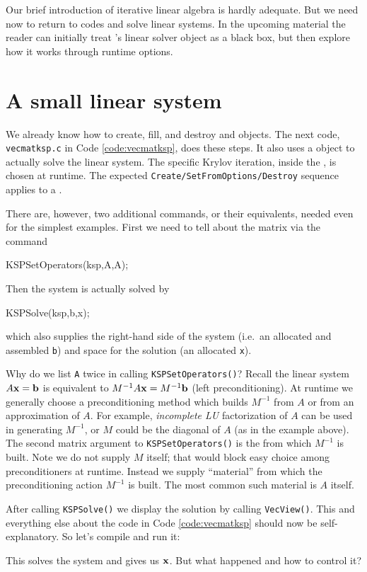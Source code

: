 Our brief introduction of iterative linear algebra is hardly adequate.  But we need now to return to \PETSc codes and solve linear systems.  In the upcoming material the reader can initially treat \PETSc's \pKSP linear solver object as a black box, but then explore how it works through runtime options.


\section{A small linear system}

We already know how to create, fill, and destroy \pVec and \pMat objects.  The next code, \texttt{vecmatksp.c} in Code \ref{code:vecmatksp}, does these steps.  It also uses a \pKSP object to actually solve the linear system.  The specific Krylov iteration, inside the \pKSP, is chosen at runtime.  The expected \texttt{Create/SetFromOptions/Destroy} sequence applies to a \pKSP.

There are, however, two additional commands, or their equivalents, needed even for the simplest examples.  First we need to tell \pKSP about the matrix via the command
\begin{code}
KSPSetOperators(ksp,A,A);
\end{code}
Then the system is actually solved by
\begin{code}
KSPSolve(ksp,b,x);
\end{code}
which also supplies the right-hand side of the system (i.e.~an allocated and assembled \pVec \texttt{b}) and space for the solution (an allocated \pVec \texttt{x}).

Why do we list \texttt{A} twice in calling \texttt{KSPSetOperators()}?  Recall the linear system $A\mathbf{x}=\mathbf{b}$ is equivalent to $M^{-1} A \mathbf{x} = M^{-1} \mathbf{b}$ (left preconditioning).  At runtime we generally choose a preconditioning method which builds $M^{-1}$ from $A$ or from an approximation of $A$.  For example, \emph{incomplete LU} factorization of $A$ can be used in generating $M^{-1}$, or $M$ could be the diagonal of $A$ (as in the example above).  The second matrix argument to \texttt{KSPSetOperators()} is the \pMat from which $M^{-1}$ is built.  Note we do not supply $M$ itself; that would block easy choice among preconditioners at runtime.  Instead we supply ``material'' from which the preconditioning action $M^{-1}$ is built.  The most common such material is $A$ itself.

After calling \texttt{KSPSolve()} we display the solution \pVec by calling \texttt{VecView()}.  This and everything else about the code in Code \ref{code:vecmatksp} should now be self-explanatory.  So let's compile and run it:
This solves the system and gives us $\mathbf{x}$.  But what happened and how to control it?

